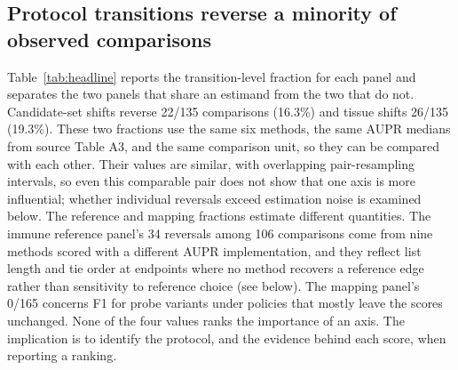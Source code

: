 \documentclass[10pt,letterpaper]{article}
\begin{document}
\subsection*{Protocol transitions reverse a minority of observed comparisons}
Table~\ref{tab:headline} reports the transition-level fraction for each panel and separates the two panels that share an estimand from the two that do not. Candidate-set shifts reverse 22/135 comparisons (16.3\%) and tissue shifts 26/135 (19.3\%). These two fractions use the same six methods, the same AUPR medians from source Table A3, and the same comparison unit, so they can be compared with each other. Their values are similar, with overlapping pair-resampling intervals, so even this comparable pair does not show that one axis is more influential; whether individual reversals exceed estimation noise is examined below. The reference and mapping fractions estimate different quantities. The immune reference panel's 34 reversals among 106 comparisons come from nine methods scored with a different AUPR implementation, and they reflect list length and tie order at endpoints where no method recovers a reference edge rather than sensitivity to reference choice (see below). The mapping panel's 0/165 concerns F1 for probe variants under policies that mostly leave the scores unchanged. None of the four values ranks the importance of an axis. The implication is to identify the protocol, and the evidence behind each score, when reporting a ranking.
\end{document}
